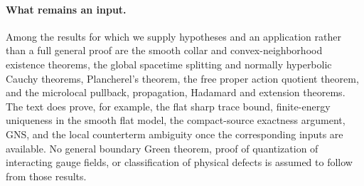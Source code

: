 \paragraph{What remains an input.} Among the results for which we supply hypotheses and an application rather than a full general proof are the smooth collar and convex-neighborhood existence theorems, the global spacetime splitting and normally hyperbolic Cauchy theorems, Plancherel's theorem, the free proper action quotient theorem, and the microlocal pullback, propagation, Hadamard and extension theorems. The text does prove, for example, the flat sharp trace bound, finite-energy uniqueness in the smooth flat model, the compact-source exactness argument, GNS, and the local counterterm ambiguity once the corresponding inputs are available. No general boundary Green theorem, proof of quantization of interacting gauge fields, or classification of physical defects is assumed to follow from those results.



